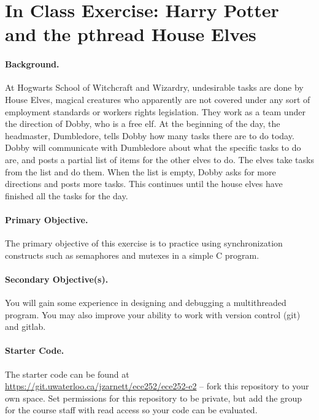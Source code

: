 




\section*{In Class Exercise: Harry Potter and the pthread House Elves}

\paragraph{Background.}
At Hogwarts School of Witchcraft and Wizardry, undesirable tasks are done by House
Elves, magical creatures who apparently are not covered under any sort of employment
standards or workers rights legislation. They work as a team under the direction of
Dobby, who is a free elf. At the beginning of the day, the headmaster, Dumbledore, tells Dobby how many tasks there are to do today. Dobby will communicate with Dumbledore about what the specific tasks to do are, and posts a partial list of items for the other elves to do. The elves take tasks from the list and do them. When the list is empty, Dobby asks for more directions and posts more tasks. This continues until the house elves have finished all the tasks for the day.

\paragraph{Primary Objective.} The primary objective of this exercise is to practice using synchronization constructs such as semaphores and mutexes in a simple C program.

\paragraph{Secondary Objective(s).} You will gain some experience in designing and debugging a multithreaded program. You may also improve your ability to work with version control (git) and gitlab.

\paragraph{Starter Code.} The starter code can be found at \url{https://git.uwaterloo.ca/jzarnett/ece252/ece252-e2} -- fork this repository to your own space. Set permissions for this repository to be private, but add the group for the course staff with read access so your code can be evaluated.

